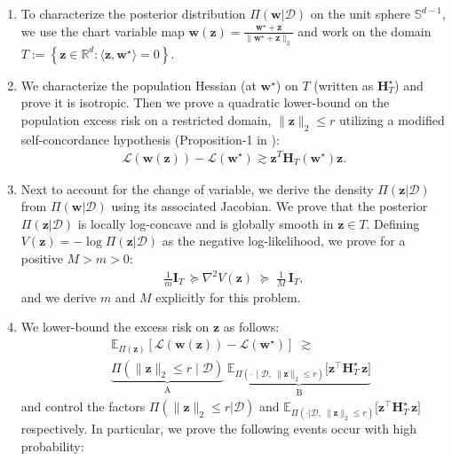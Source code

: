 \documentclass{article}
\theoremstyle{plain}
\theoremstyle{definition}
\theoremstyle{remark}
\begin{document}
\begin{enumerate}
[leftmargin=*,itemsep=0pt,topsep=1pt]
\item To characterize the posterior distribution $\Pi(\mathbf{w}|\mathcal{D})$ on the unit sphere $\mathbb{S}^{d-1}$, we use the chart variable map $\mathbf{w}(\mathbf{z})=\frac{\mathbf w^\star+\mathbf z}{\|\mathbf w^\star+\mathbf z\|_2}$ and work on the domain $T := \left\{ \mathbf{z}\in\mathbb{R}^d : \langle \mathbf{z}, \mathbf{w}^\star \rangle = 0 \right\}$. 
\item We characterize the population Hessian (at $\mathbf{w}^{\star}$) on $T$ (written as $\mathbf{H}^{\star}_{T}$) and prove it is isotropic. Then we prove a quadratic lower-bound on the population excess risk on a restricted domain, $\|\mathbf{z}\|_{2}\leq r$ utilizing a modified self-concordance hypothesis (Proposition-1 in \cite{bach2010self}):
\begin{align}
\mathcal L(\mathbf w(\mathbf z))-\mathcal L(\mathbf w^\star) \gtrsim \mathbf z^{T}\mathbf{H}_{T}(\mathbf{w}^{\star}) \mathbf z.
\end{align}
\item Next to account for the change of variable, we derive the density $\Pi(\mathbf{z}| \mathcal{D})$ from $\Pi(\mathbf{ w}|\mathcal{D})$ using its associated Jacobian. We prove that the posterior $\Pi(\mathbf{z}|\mathcal{D})$ is locally log-concave and is globally smooth in $\mathbf{z}\in T$. Defining $V(\mathbf z)=-\log\Pi(\mathbf{z}|\mathcal{D})$ as the negative log-likelihood, we prove for a positive $M>m>0$: 
 \begin{align}
 \label{hess-control}
\frac{1}{m}\mathbf I_T\,\succeq\nabla^2 V(\mathbf z) \;\succeq\; \frac{1}{M}\,\mathbf I_T ,
\end{align}
and we derive $m$ and $M$ explicitly for this problem. 
    \item We lower-bound the excess risk on $\mathbf{z}$ as follows:
    \begin{align*}
     &    \mathbb E_{\Pi(\mathbf z)}[ \mathcal{L}(\mathbf w(\mathbf z))-\mathcal L(\mathbf w^\star)]
\;\gtrsim\; \\
\;
& \underbrace{\Pi(\|\mathbf z\|_2\le r\mid \mathcal{D})}_{\text{A}}\;
\underbrace{\mathbb E_{\Pi(\cdot\,\mid \mathcal{D},\ \|\mathbf z\|_2\le r)}\!\big[\mathbf z^\top \mathbf{H}^{\star}_{T}\,\mathbf z\big]}_{\text{B}}
    \end{align*}
    and control the factors $\Pi(\|\mathbf z\|_2 \leq r| \mathcal{D})$ and $\mathbb E_{\Pi(\cdot| \mathcal{D},\ \|\mathbf z\|_2\le r)}\!\big[\mathbf z^\top \mathbf H^{\star}_{T}\,\mathbf z\big]$ respectively. In particular, we prove the following events occur with high probability:

\end{enumerate}
\end{document}
